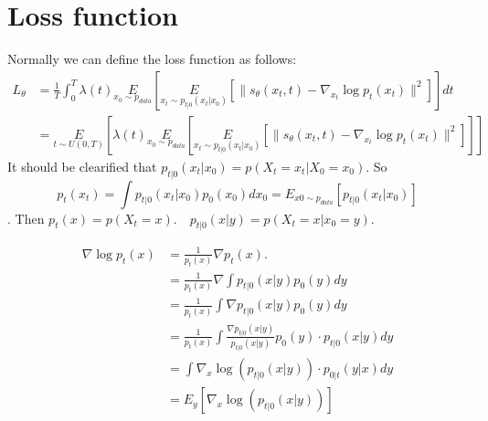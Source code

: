 \documentclass{ctexart}
\begin{document}
\section{Loss function}
Normally we can define the loss function as follows:
\begin{equation}
    \begin{aligned}
        L_\theta & = \frac{1}{T}\int_0^T\lambda(t)\underset{x_0\sim p_{data}}{E}\left[\underset{x_t\sim p_{t|0}(x_t|x_0)}{E}\left[\|s_\theta(x_t, t)-\nabla_{x_t}\log p_t(x_t)\|^2\right]\right]dt\\
        &=\underset{t\sim U(0, T)}{E}\left[\lambda(t)\underset{x_0\sim p_{data}}{E}\left[\underset{x_t\sim p_{t|0}(x_t|x_0)}{E}\left[\|s_\theta(x_t, t)-\nabla_{x_t}\log p_t(x_t)\|^2\right]\right]\right]
    \end{aligned}
\end{equation}
It should be clearified that $p_{t|0}(x_t|x_0)=p(X_t=x_t|X_0=x_0)$. So $$p_t(x_t)=\int p_{t|0}(x_t|x_0)p_0(x_0)dx_0=E_{x0\sim p_{data}}\left[p_{t|0}(x_t|x_0)\right]$$.
Then $p_{t}(x)=p\left(X_{t}=x\right) . \quad p_{t | 0}(x | y)=p\left(X_{t}=x | x_{0}=y\right)$.

\begin{equation}
    \begin{aligned}
    \nabla \log p_{t}(x) & =\frac{1}{p_{t}(x)} \nabla p_{t}(x) . \\
    & =\frac{1}{p_{t}(x)} \nabla \int p_{t | 0}(x | y) p_{0}(y) d y \\
    & =\frac{1}{p_{t}(x)} \int \nabla p_{t | 0}(x | y) p_{0}(y) d y \\
    & =\frac{1}{p_{t}(x)} \int \frac{\nabla p_{t | 0}(x | y)}{p_{t | 0}(x | y)} p_{0}(y) \cdot p_{t | 0}(x | y) d y \\
    & =\int \nabla_{x} \log \left(p_{t | 0}(x | y)\right) \cdot p_{0 | t}(y | x) d y \\
    & =E_{y}\left[\nabla_{x} \log \left(p_{t | 0}(x | y)\right)\right]
    \end{aligned}
\end{equation}
\end{document}
